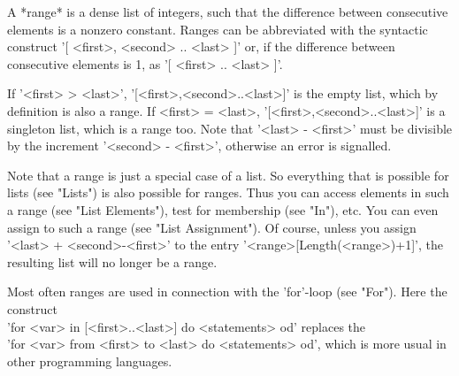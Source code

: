 
A *range* is a dense list of integers,  such  that the difference between
consecutive  elements is a nonzero  constant.   Ranges can be abbreviated
with the syntactic construct '[ <first>, <second> .. <last> ]' or, if the
difference between consecutive elements is 1, as '[ <first> .. <last> ]'.

If  '<first> > <last>',  '[<first>,<second>..<last>]' is  the empty list,
which   by  definition  is   also   a  range.    If   <first>  =  <last>,
'[<first>,<second>..<last>]' is a singleton list,  which is a range  too.
Note that '<last> - <first>' must be divisible by the increment '<second>
- <first>', otherwise an error is signalled.

Note  that a range is  just a special case of a list.  So everything that
is  possible for lists (see "Lists") is also  possible for ranges.   Thus
you can  access elements in such a range (see "List Elements"),  test for
membership  (see  "In"), etc.   You can even assign to such a  range (see
"List   Assignment").   Of   course,  unless   you   assign   '<last>   +
<second>-<first>'  to   the   entry   '<range>[Length(<range>)+1]',   the
resulting list will no longer be a range.

Most often ranges are used in connection with the 'for'-loop (see "For").
Here  the construct \\
'for <var>  in [<first>..<last>]  do <statements>  od' replaces the \\
'for <var>  from <first>  to <last>  do <statements>  od',  which is more
usual in other programming languages.

